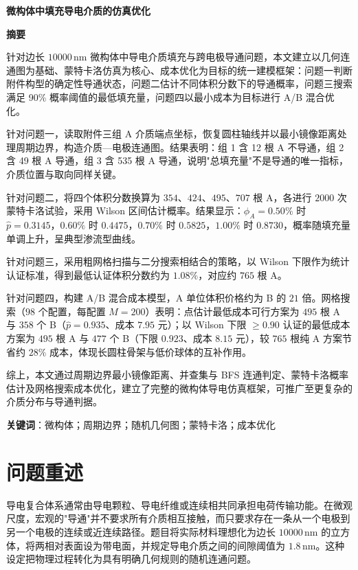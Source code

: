 \documentclass[12pt,a4paper,fontset=windows]{ctexart}
\newcommand{\abstractpage}[3]{%
    \thispagestyle{plain}%
    \pagenumbering{arabic}%
    \setcounter{page}{1}%
    \begin{center}
        {\bfseries\zihao{3} #1}%
    \end{center}
    \vspace{0.5em}
    \begin{center}
        {\bfseries\zihao{4} 摘\quad 要}%
    \end{center}
    \vspace{0.5em}
    #2%
    \vspace{1em}
    \par\noindent\textbf{关键词}：#3
    \newpage
}
\newcommand{\nm}{\,\mathrm{nm}}
\begin{document}
\abstractpage{微构体中填充导电介质的仿真优化}%
{%
针对边长 $10000\nm$ 微构体中导电介质填充与跨电极导通问题，本文建立以几何连通图为基础、蒙特卡洛仿真为核心、成本优化为目标的统一建模框架：问题一判断附件构型的确定性导通状态，问题二估计不同体积分数下的导通概率，问题三搜索满足 90\% 概率阈值的最低填充量，问题四以最小成本为目标进行 A/B 混合优化。

针对问题一，读取附件三组 A 介质端点坐标，恢复圆柱轴线并以最小镜像距离处理周期边界，构造介质—电极连通图。结果表明：组 1 含 12 根 A 不导通，组 2 含 49 根 A 导通，组 3 含 535 根 A 导通，说明"总填充量"不是导通的唯一指标，介质位置与取向同样关键。

针对问题二，将四个体积分数换算为 $354$、$424$、$495$、$707$ 根 A，各进行 $2000$ 次蒙特卡洛试验，采用 Wilson 区间估计概率。结果显示：$\phi_A=0.50\%$ 时 $\hat p=0.3145$，$0.60\%$ 时 $0.4475$，$0.70\%$ 时 $0.5825$，$1.00\%$ 时 $0.8730$，概率随填充量单调上升，呈典型渗流型曲线。

针对问题三，采用粗网格扫描与二分搜索相结合的策略，以 Wilson 下限作为统计认证标准，得到最低认证体积分数约为 $1.08\%$，对应约 $765$ 根 A。

针对问题四，构建 A/B 混合成本模型，A 单位体积价格约为 B 的 $21$ 倍。网格搜索（$98$ 个配置，每配置 $M=200$）表明：点估计最低成本可行方案为 $495$ 根 A 与 $358$ 个 B（$\hat p=0.935$、成本 $7.95$ 元）；以 Wilson 下限 $\ge 0.90$ 认证的最低成本方案为 $495$ 根 A 与 $477$ 个 B（下限 $0.923$、成本 $8.15$ 元），较 $765$ 根纯 A 方案节省约 $28\%$ 成本，体现长圆柱骨架与低价球体的互补作用。

综上，本文通过周期边界最小镜像距离、并查集与 BFS 连通判定、蒙特卡洛概率估计及网格搜索成本优化，建立了完整的微构体导电仿真框架，可推广至更复杂的介质分布与导通判据。
}%
{微构体；周期边界；随机几何图；蒙特卡洛；成本优化}

\section{问题重述}

导电复合体系通常由导电颗粒、导电纤维或连续相共同承担电荷传输功能。在微观尺度，宏观的"导通"并不要求所有介质相互接触，而只要求存在一条从一个电极到另一个电极的连续或近连续路径。题目将实际材料理想化为边长 $10000\nm$ 的立方体，将两相对表面设为带电面，并规定导电介质之间的间隙阈值为 $1.8\nm$。这种设定把物理过程转化为具有明确几何规则的随机连通问题。
\end{document}
